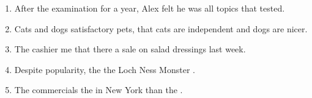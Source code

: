 \begin{enumerate}
\item \begin{inparaenum}[A]
After  the examination for a year, Alex felt  he was  all topics that  tested. 
\end{inparaenum}

\item \begin{inparaenum}[A]
Cats and dogs   satisfactory pets,  that cats are  independent and dogs are nicer. 
\end{inparaenum}

\item \begin{inparaenum}[A]
The cashier  me that there  a sale on salad dressings   last week. 
\end{inparaenum}

\item \begin{inparaenum}[A]
Despite  popularity, the  the Loch Ness Monster  . 
\end{inparaenum}

\item \begin{inparaenum}[A]
The commercials  the  in New York  than the . 
\end{inparaenum}


\end{enumerate}
